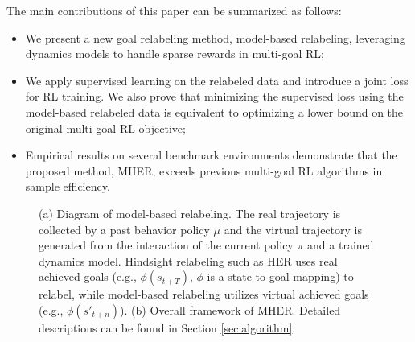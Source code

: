 \documentclass{article}
\begin{document}


The main contributions of this paper can be summarized as follows:
\begin{itemize}
    \item We present a new goal relabeling method, model-based relabeling, leveraging dynamics models to handle sparse rewards in multi-goal RL;
    \item We apply supervised learning on the relabeled data and introduce a joint loss for RL training. We also prove that minimizing the supervised loss using the model-based relabeled data is equivalent to optimizing a lower bound on the original multi-goal RL objective;
    \item Empirical results on several benchmark environments demonstrate that the proposed method, MHER, exceeds previous multi-goal RL algorithms in sample efficiency.
\end{itemize}

 \begin{figure}[t]
    \centering
    \caption{(a) Diagram of model-based relabeling. The real trajectory is collected by a past behavior policy $\mu$ and the virtual trajectory is generated from the interaction of the current policy $\pi$ and a trained dynamics model. Hindsight relabeling such as HER uses real achieved goals (e.g., $\phi(s_{t+T})$, $\phi$ is a state-to-goal mapping) to relabel, while model-based relabeling utilizes virtual achieved goals (e.g., $\phi(s'_{t+n})$). (b) Overall framework of MHER. Detailed descriptions can be found in Section \ref{sec:algorithm}.}
    \label{fig:diagram}
\end{figure}
\end{document}
